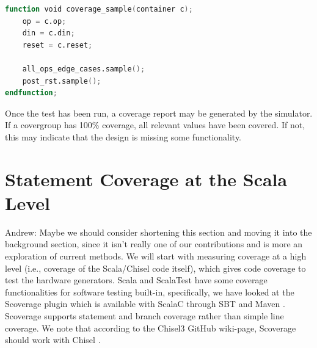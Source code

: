 \documentclass[runningheads]{llncs}
\newcommand{\martin}[1]{{\color{blue} Martin: #1}}
\newcommand{\andrew}[1]{{\color{red} Andrew: #1}}
\begin{document}
\begin{lstlisting}[language=verilog]
function void coverage_sample(container c);
	op = c.op;
	din = c.din;
	reset = c.reset;
	
	all_ops_edge_cases.sample();
	post_rst.sample();
endfunction;
\end{lstlisting}

Once the test has been run, a coverage report may be generated by the simulator. If a covergroup has 100\% coverage, all relevant values have been covered. If not, this may indicate that the design is missing some functionality.



\section{Statement Coverage at the Scala Level}
\andrew{Maybe we should consider shortening this section and moving it into the background section, since it isn't really one of our contributions and is more an exploration of current methods.}
We will start with measuring coverage at a high level (i.e., coverage of the Scala/Chisel code itself), which gives code coverage to test the hardware generators. Scala and ScalaTest have some coverage functionalities for software testing built-in, specifically, we have looked at the Scoverage plugin which is available with ScalaC through SBT and Maven \cite{scoverage}. Scoverage supports statement and branch coverage rather than simple line coverage. We note that according to the Chisel3 GitHub wiki-page, Scoverage should work with Chisel \cite{chisel:scoverage}.

\end{document}
